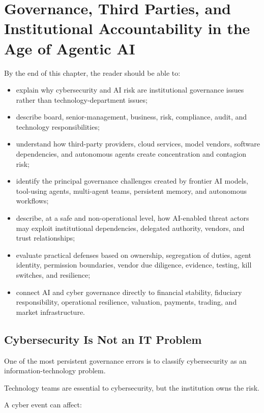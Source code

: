 \chapter{Governance, Third Parties, and Institutional Accountability in the Age of Agentic AI}

\begin{learningobjectives}
By the end of this chapter, the reader should be able to:
\begin{itemize}
    \item explain why cybersecurity and AI risk are institutional governance issues rather than technology-department issues;
    \item describe board, senior-management, business, risk, compliance, audit, and technology responsibilities;
    \item understand how third-party providers, cloud services, model vendors, software dependencies, and autonomous agents create concentration and contagion risk;
    \item identify the principal governance challenges created by frontier AI models, tool-using agents, multi-agent teams, persistent memory, and autonomous workflows;
    \item describe, at a safe and non-operational level, how AI-enabled threat actors may exploit institutional dependencies, delegated authority, vendors, and trust relationships;
    \item evaluate practical defenses based on ownership, segregation of duties, agent identity, permission boundaries, vendor due diligence, evidence, testing, kill switches, and resilience;
    \item connect AI and cyber governance directly to financial stability, fiduciary responsibility, operational resilience, valuation, payments, trading, and market infrastructure.
\end{itemize}
\end{learningobjectives}

\section{Cybersecurity Is Not an IT Problem}

One of the most persistent governance errors is to classify cybersecurity as an information-technology problem.

Technology teams are essential to cybersecurity, but the institution owns the risk.

A cyber event can affect:

